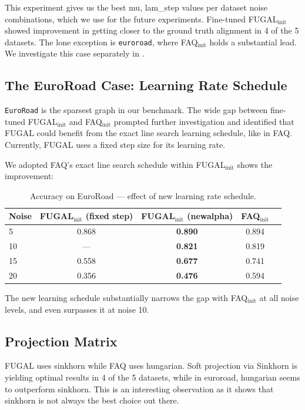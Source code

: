 \documentclass[11pt,a4paper]{article}
\begin{document}
This experiment gives us the best mu, lam\_step values per dataset noise combinations, which we use for the future experiments.
Fine-tuned FUGAL$_{\text{init}}$ showed improvement in getting closer to the ground truth alignment in 4 of the 5 datasets. The lone exception is \texttt{euroroad}, where FAQ$_{\text{init}}$ holds a substantial lead.  We investigate this case separately in .

\subsection{The EuroRoad Case: Learning Rate Schedule}
\label{sec:euroroad}

\texttt{EuroRoad} is the sparsest graph in our benchmark. The wide gap between fine-tuned FUGAL$_{\text{init}}$ and FAQ$_{\text{init}}$ prompted further investigation and identified that FUGAL could benefit from the exact line search learning schedule, like in FAQ. Currently,
FUGAL uses a fixed step size for its learning rate.

We adopted FAQ's exact line search schedule within FUGAL$_{\text{init}}$  shows the improvement:

\begin{table}[H]
  \centering
  \caption{Accuracy on EuroRoad — effect of new learning rate schedule.}
  \label{tab:newalpha}
  \begin{tabular}{lcccc}
    \toprule
    Noise & FUGAL$_{\text{init}}$ (fixed step) & FUGAL$_{\text{init}}$ (newalpha) & FAQ$_{\text{init}}$ \\
    \midrule
    5  & 0.868 & \textbf{0.890} & 0.894 \\
    10 & --- & \textbf{0.821} & 0.819 \\
    15 & 0.558 & \textbf{0.677} & 0.741 \\
    20 & 0.356 & \textbf{0.476} & 0.594 \\
    \bottomrule
  \end{tabular}
\end{table}

The new learning schedule substantially narrows the gap with FAQ$_{\text{init}}$ at all noise levels, and even surpasses it at noise 10.

\subsection{Projection Matrix}
FUGAL uses sinkhorn while FAQ uses hungarian. Soft projection via Sinkhorn is yielding optimal results in 4 of the 5 datasets, while in euroroad, hungarian seems to outperform sinkhorn. This is an interesting observation as it shows that sinkhorn is not always the best choice out there.
\end{document}
